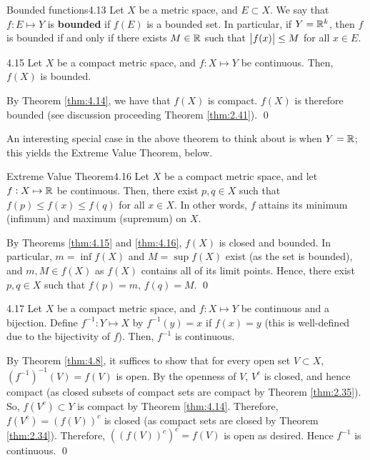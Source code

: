 \setcounter{rudin}{12}
\begin{definition}{Bounded functions}{4.13}
    Let $X$ be a metric space, and $E \subset X$. We say that $f: E \mapsto Y$ is \textbf{bounded} if $f(E)$ is a bounded set. In particular, if $Y = \mathbb{R}^k$, then $f$ is bounded if and only if there exists $M \in \mathbb{R}$ such that $\abs{f(x)} \leq M$ for all $x \in E$.
\end{definition}

\setcounter{rudin}{14}
\begin{theorem}{}{4.15}
    Let $X$ be a compact metric space, and $f: X \mapsto Y$ be continuous. Then, $f(X)$ is bounded.
\end{theorem}
\begin{nproof}
    By Theorem \ref{thm:4.14}, we have that $f(X)$ is compact. $f(X)$ is therefore bounded (see discussion proceeding Theorem \ref{thm:2.41}). \qed
\end{nproof}
\noindent An interesting special case in the above theorem to think about is when $Y = \mathbb{R}$; this yields the Extreme Value Theorem, below.

\begin{theorem}{Extreme Value Theorem}{4.16}
    Let $X$ be a compact metric space, and let $f: X \mapsto \mathbb{R}$ be continuous. Then, there exist $p, q \in X$ such that $f(p) \leq f(x) \leq f(q)$ for all $x \in X$. In other words, $f$ attains its minimum (infimum) and maximum (supremum) on $X$.
\end{theorem}
\begin{nproof}
    By Theorems \ref{thm:4.15} and \ref{thm:4.16}, $f(X)$ is closed and bounded. In particular, $m = \inf f(X)$ and $M = \sup f(X)$ exist (as the set is bounded), and $m, M \in f(X)$ as $f(X)$ contains all of its limit points. Hence, there exist $p, q \in X$ such that $f(p) = m$, $f(q) = M$. \qed
\end{nproof}

\begin{theorem}{}{4.17}
    Let $X$ be a compact metric space, and $f: X \mapsto Y$ be continuous and a bijection. Define $f^{-1}: Y \mapsto X$ by $f^{-1}(y) = x$ if $f(x) = y$ (this is well-defined due to the bijectivity of $f$). Then, $f^{-1}$ is continuous.
\end{theorem}
\begin{nproof}
    By Theorem \ref{thm:4.8}, it suffices to show that for every open set $V \subset X$, $\left(f^{-1}\right)^{-1}(V) = f(V)$ is open. By the openness of $V$, $V^c$ is closed, and hence compact (as closed subsets of compact sets are compact by Theorem \ref{thm:2.35}). So, $f(V^c) \subset Y$ is compact by Theorem \ref{thm:4.14}. Therefore, $f(V^c) = \left(f(V)\right)^c$ is closed (as compact sets are closed by Theorem \ref{thm:2.34}). Therefore, $\left(\left(f(V)\right)^c\right)^c = f(V)$ is open as desired. Hence $f^{-1}$ is continuous. \qed
\end{nproof}

